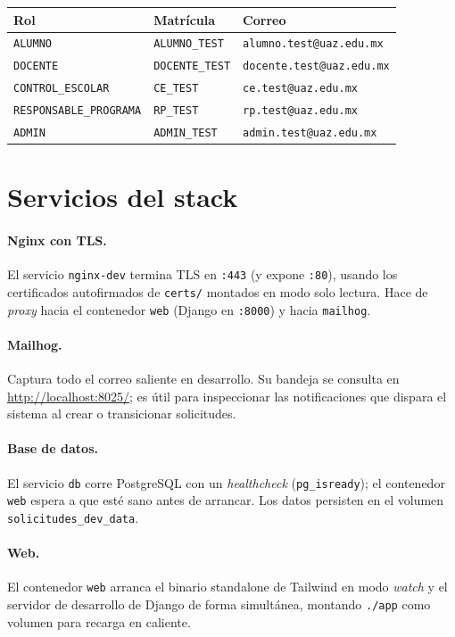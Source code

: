 \documentclass[12pt,letterpaper]{report}
\begin{document}
\begin{longtable}{L{5cm} L{3.5cm} L{5cm}}
\toprule
\textbf{Rol} & \textbf{Matrícula} & \textbf{Correo} \\
\midrule
\endhead
\texttt{ALUMNO} & \texttt{ALUMNO\_TEST} & \texttt{alumno.test@uaz.edu.mx} \\
\texttt{DOCENTE} & \texttt{DOCENTE\_TEST} & \texttt{docente.test@uaz.edu.mx} \\
\texttt{CONTROL\_ESCOLAR} & \texttt{CE\_TEST} & \texttt{ce.test@uaz.edu.mx} \\
\texttt{RESPONSABLE\_PROGRAMA} & \texttt{RP\_TEST} & \texttt{rp.test@uaz.edu.mx} \\
\texttt{ADMIN} & \texttt{ADMIN\_TEST} & \texttt{admin.test@uaz.edu.mx} \\
\bottomrule
\end{longtable}

\section{Servicios del stack}

\paragraph{Nginx con TLS.} El servicio \texttt{nginx-dev} termina TLS en
\texttt{:443} (y expone \texttt{:80}), usando los certificados autofirmados de
\texttt{certs/} montados en modo solo lectura. Hace de \emph{proxy} hacia el
contenedor \texttt{web} (Django en \texttt{:8000}) y hacia \texttt{mailhog}.

\paragraph{Mailhog.} Captura todo el correo saliente en desarrollo. Su bandeja se
consulta en \url{http://localhost:8025/}; es útil para inspeccionar las
notificaciones que dispara el sistema al crear o transicionar solicitudes.

\paragraph{Base de datos.} El servicio \texttt{db} corre PostgreSQL con un
\emph{healthcheck} (\texttt{pg\_isready}); el contenedor \texttt{web} espera a que
esté sano antes de arrancar. Los datos persisten en el volumen
\texttt{solicitudes\_dev\_data}.

\paragraph{Web.} El contenedor \texttt{web} arranca el binario standalone de
Tailwind en modo \emph{watch} y el servidor de desarrollo de Django de forma
simultánea, montando \texttt{./app} como volumen para recarga en caliente.
\end{document}
